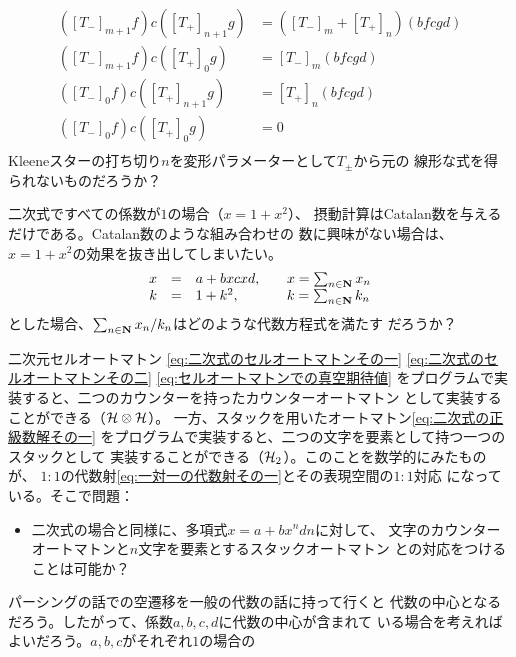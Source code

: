 {\begin{description}
\begin{equation*}
\begin{split}
			([T_-]_{m+1}f)c([T_+]_{n+1}g) &= ([T_-]_m + [T_+]_n)(bfcgd) \\
			([T_-]_{m+1}f)c([T_+]_0g) &= [T_-]_m(bfcgd) \\
			([T_-]_0f)c([T_+]_{n+1}g) &= [T_+]_n(bfcgd) \\
			([T_-]_0f)c([T_+]_0g) &= 0 \\
		\end{split}\end{equation*}
		Kleeneスターの打ち切り$n$を変形パラメーターとして$T_\pm$から元の
		線形な式を得られないものだろうか？
		\item[組み合わせの数] 二次式ですべての係数が$1$の場合（$x=1+x^2$）、
		摂動計算はCatalan数を与えるだけである。Catalan数のような組み合わせの
		数に興味がない場合は、$x=1+x^2$の効果を抜き出してしまいたい。
		\begin{equation*}\begin{array}{rcll}
			x &=& a + bxcxd,&\quad x = \sum_{n\in\mathbf{N}} x_n \\
			k &=& 1 + k^2,&\quad k = \sum_{n\in\mathbf{N}} k_n \\
		\end{array}\end{equation*}
		とした場合、$\sum_{n\in\mathbf{N}}x_n/k_n$はどのような代数方程式を満たす
		だろうか？
		\item[カウンターオートマトン] 二次元セルオートマトン
		\eqref{eq:二次式のセルオートマトンその一}
		\eqref{eq:二次式のセルオートマトンその二}
		\eqref{eq:セルオートマトンでの真空期待値}
		をプログラムで実装すると、二つのカウンターを持ったカウンターオートマトン
		として実装することができる（${{\mathcal{H}}}\otimes{\ensuremath{{\mathcal{H}}}}$）。
		一方、スタックを用いたオートマトン\eqref{eq:二次式の正級数解その一}
		をプログラムで実装すると、二つの文字を要素として持つ一つのスタックとして
		実装することができる（${{\mathcal{H}}}_2$）。このことを数学的にみたものが、
		$1:1$の代数射\eqref{eq:一対一の代数射その一}とその表現空間の$1:1$対応
		になっている。そこで問題：
		\begin{itemize}\setlength{\itemsep}{-1mm} %
			\item 二次式の場合と同様に、多項式$x=a+bx^nd$$n$に対して、
			文字のカウンターオートマトンと$n$文字を要素とするスタックオートマトン
			との対応をつけることは可能か？
		\end{itemize} %
		\item[空遷移] パーシングの話での空遷移を一般の代数の話に持って行くと
		代数の中心となるだろう。したがって、係数$a,b,c,d$に代数の中心が含まれて
		いる場合を考えればよいだろう。$a,b,c$がそれぞれ$1$の場合の

\end{description}}
